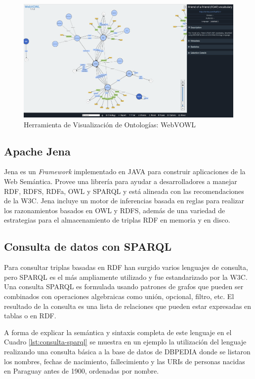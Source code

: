 \begin{figure}[h!]
    \centering
    \includegraphics[width=150mm]{figuras/webvowl}
    \caption{Herramienta de Visualización de Ontologías: WebVOWL}
    \label{img:webvowl}
    \end{figure}
    

\subsection{Apache Jena}
Jena es un \textit{Framework} implementado en JAVA para construir aplicaciones de la Web Semántica. Provee una librería para ayudar a desarrolladores a manejar RDF, RDFS, RDFa, OWL y SPARQL y está alineada con las recomendaciones de la W3C. Jena incluye un motor de inferencias basada en reglas para realizar los razonamientos basados en OWL y RDFS, además de una variedad de estrategias para el almacenamiento de triplas RDF en memoria y en disco.

\subsection{Consulta de datos con SPARQL}
Para consultar triplas basadas en RDF han surgido varios lenguajes de consulta, pero SPARQL es el más ampliamente utilizado y fue estandarizado por la W3C. Una consulta SPARQL es formulada usando patrones de grafos que pueden ser combinados con operaciones algebraicas como unión, opcional, filtro, etc. El resultado de la consulta es una lista de relaciones que pueden estar expresadas en tablas o en RDF.

A forma de explicar la semántica y sintaxis completa de este lenguaje en el Cuadro \ref{lst:consulta-sparql} se muestra en un ejemplo la utilización del lenguaje realizando una consulta básica a la base de datos de DBPEDIA \cite{DBpedia:online} donde se listaron los nombres, fechas de nacimiento, fallecimiento y las URIs de personas nacidas en Paraguay antes de 1900, ordenadas por nombre.\hfill \break


